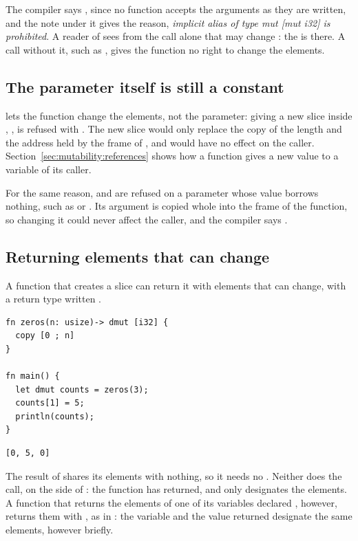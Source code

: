 The compiler says , since no function  accepts the
arguments as they are written, and the note under it gives the reason,
\textit{implicit alias of type mut [mut i32] is prohibited}. A reader of
 sees from the call alone that  may change
: the  is there. A call without it, such as
, gives the function no right to change the elements.

\subsection{The parameter itself is still a constant}

 lets the function change the elements, not the parameter: giving
 a new slice inside , ,
is refused with . The new slice would only replace the copy of the length and the
address held by the frame of , and would have no effect on the
caller. Section~\ref{sec:mutability:references} shows how a function gives a new
value to a variable of its caller.

For the same reason,  and  are refused on a parameter
whose value borrows nothing, such as  or
. Its argument is copied whole into the frame of
the function, so changing it could never affect the caller, and the compiler
says .

\subsection{Returning elements that can change}

A function that creates a slice can return it with elements that can change,
with a return type written .

\begin{lstlisting}[style=coloredverbatim]
fn zeros(n: usize)-> dmut [i32] {
  copy [0 ; n]
}

fn main() {
  let dmut counts = zeros(3);
  counts[1] = 5;
  println(counts);
}
\end{lstlisting}
\vspace{-10pt}%
\begin{lstlisting}[style=bashVerb]
[0, 5, 0]
\end{lstlisting}

The result of  shares its elements with nothing, so it needs no
. Neither does the call, on the side of : the function
has returned, and only  designates the elements. A function that
returns the elements of one of its variables declared , however,
returns them with , as in : the variable and
the value returned designate the same elements, however briefly.

